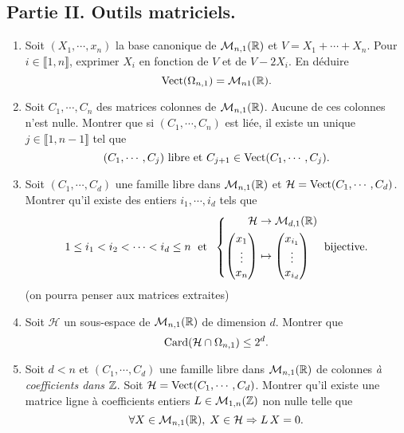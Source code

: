 \subsection*{Partie II. Outils matriciels.}
\begin{enumerate}
 \item Soit $(X_1, \cdots, x_n)$ la base canonique de $\mathcal{M}_{n, 1}(\mathbb{R})$ et $V=X_1 + \cdots + X_n$.\newline
 Pour $i\in \llbracket 1,n \rrbracket$, exprimer $X_i$ en fonction de $V$ et de $V-2X_i$. En déduire 
 \[
  \operatorname{Vect}( \Omega_{n,1}) = \mathcal{M}_{n 1}(\mathbb{R}).
 \]

 \item Soit $C_1, \cdots, C_n$ des matrices colonnes de $\mathcal{M}_{n,1}(\mathbb{R})$. Aucune de ces colonnes n'est nulle. Montrer que si $(C_1, \cdots, C_n)$ est liée, il existe un unique $j\in \llbracket 1, n-1 \rrbracket$ tel que 
\[
   (C_1,\cdots, C_j) \text{ libre et } C_{j+1} \in \operatorname{Vect}(C_1,\cdots, C_j) .
\]

 \item Soit $(C_1, \cdots ,C_d)$ une famille libre dans $\mathcal{M}_{n,1}(\mathbb{R})$ et $\mathcal{H} = \operatorname{Vect}(C_1, \cdots, C_d)$. Montrer qu'il existe des entiers $i_1, \cdots ,i_d$ tels que 
\[
 1 \leq i_1 < i_2 < \cdots < i_d \leq n \;\text{ et }\;
 \left\lbrace 
 \begin{aligned}
  \mathcal{H} &\rightarrow \mathcal{M}_{d,1}(\mathbb{R}) \\
  \begin{pmatrix}
   x_1 \\ \vdots \\ x_n
  \end{pmatrix}
   &\mapsto
   \begin{pmatrix}
   x_{i_1} \\ \vdots \\ x_{i_d}
  \end{pmatrix}
 \end{aligned}
\right.  \text{ bijective.}
\]
(on pourra penser aux matrices extraites)

 \item Soit $\mathcal{H}$ un sous-espace de $\mathcal{M}_{n,1}(\mathbb{R})$ de dimension $d$. Montrer que
 \[
  \operatorname{Card}(\mathcal{H} \cap \Omega_{n,1}) \leq 2^d.
 \]
 
 \item Soit $d < n$ et $(C_1, \cdots ,C_d)$ une famille libre dans $\mathcal{M}_{n,1}(\mathbb{R})$ de colonnes \emph{à coefficients dans $\mathbb{Z}$}. Soit $\mathcal{H} = \operatorname{Vect}(C_1, \cdots, C_d)$. Montrer qu'il existe une matrice ligne à coefficients entiers $L \in \mathcal{M}_{1,n}(\mathbb{Z})$ non nulle telle que 
 \[
  \forall X \in \mathcal{M}_{n,1}(\mathbb{R}), \; X \in \mathcal{H} \Rightarrow L\,X = 0.
 \]
\end{enumerate}

